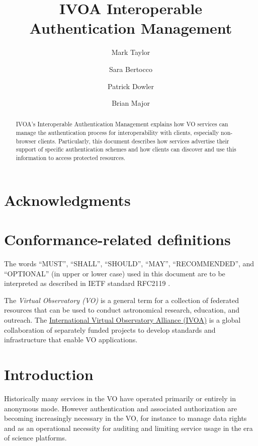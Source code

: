 \documentclass[11pt,a4paper]{ivoa}
\title{IVOA Interoperable Authentication Management}
\author{Mark Taylor}
\author{Sara Bertocco}
\author{Patrick Dowler}
\author{Brian Major}
\begin{document}
\begin{abstract}
IVOA's Interoperable Authentication Management explains how
VO services can manage the authentication process for
interoperability with clients, especially non-browser clients.
Particularly, this document
describes how services advertise their
support of specific authentication schemes and how
clients can discover and use this information to access protected
resources.
\end{abstract}




\section*{Acknowledgments}


\section*{Conformance-related definitions}

The words ``MUST'', ``SHALL'', ``SHOULD'', ``MAY'', ``RECOMMENDED'', and
``OPTIONAL'' (in upper or lower case) used in this document are to be
interpreted as described in IETF standard RFC2119 \citep{std:RFC2119}.

The \emph{Virtual Observatory (VO)} is a
general term for a collection of federated resources that can be used
to conduct astronomical research, education, and outreach.
The \href{https://www.ivoa.net}{International
Virtual Observatory Alliance (IVOA)} is a global
collaboration of separately funded projects to develop standards and
infrastructure that enable VO applications.


\section{Introduction}\label{sec:intro}

Historically many services in the VO have operated primarily or
entirely in anonymous mode.
However authentication and associated authorization
are becoming increasingly necessary in the VO,
for instance to manage data rights and as an operational necessity for
auditing and limiting service usage in the era of science platforms.
\end{document}
